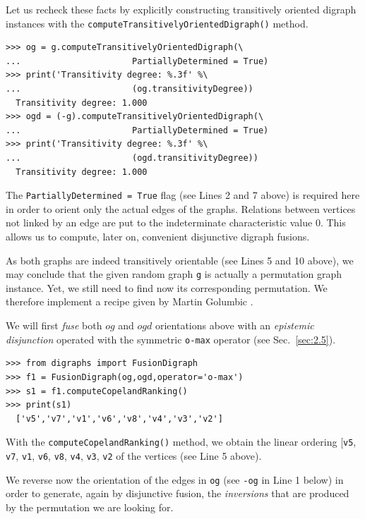 Let us recheck these facts by explicitly constructing transitively oriented digraph instances with the \texttt{computeTransitivelyOrientedDigraph()} method.
\begin{lstlisting}
>>> og = g.computeTransitivelyOrientedDigraph(\
...                      PartiallyDetermined = True)
>>> print('Transitivity degree: %.3f' %\
...                      (og.transitivityDegree)) 
  Transitivity degree: 1.000
>>> ogd = (-g).computeTransitivelyOrientedDigraph(\
...                      PartiallyDetermined = True)
>>> print('Transitivity degree: %.3f' %\
...                      (ogd.transitivityDegree)) 
  Transitivity degree: 1.000
\end{lstlisting}
The \texttt{PartiallyDetermined = True} flag (see Lines 2 and 7 above) is required here in order to orient only the actual edges of the graphs. Relations between vertices not linked by an edge are put to the indeterminate characteristic value $0$. This allows us to compute, later on, convenient disjunctive digraph fusions.

As both graphs are indeed transitively orientable (see Lines 5 and 10 above), we may conclude that the given random graph \texttt{g} is actually a permutation graph instance. Yet, we still need to find now its corresponding permutation. We therefore implement a recipe given by Martin Golumbic \citep[p. 159]{GOL-2004}.

We will first \emph{fuse} both $og$ and $ogd$ orientations above with an \emph{epistemic disjunction} operated with the symmetric \texttt{o-max} operator (see Sec.~\ref{sec:2.5}).
\begin{lstlisting}
>>> from digraphs import FusionDigraph
>>> f1 = FusionDigraph(og,ogd,operator='o-max')
>>> s1 = f1.computeCopelandRanking()
>>> print(s1)
  ['v5','v7','v1','v6','v8','v4','v3','v2']
\end{lstlisting}
With the \texttt{computeCopelandRanking()} method, we obtain the linear ordering [\texttt{v5}, \texttt{v7}, \texttt{v1}, \texttt{v6}, \texttt{v8}, \texttt{v4}, \texttt{v3}, \texttt{v2} of the vertices (see Line 5 above).

We reverse now the orientation of the edges in \texttt{og} (see \texttt{-og} in Line 1 below) in order to generate, again by disjunctive fusion, the \emph{inversions} that are produced by the permutation we are looking for.

